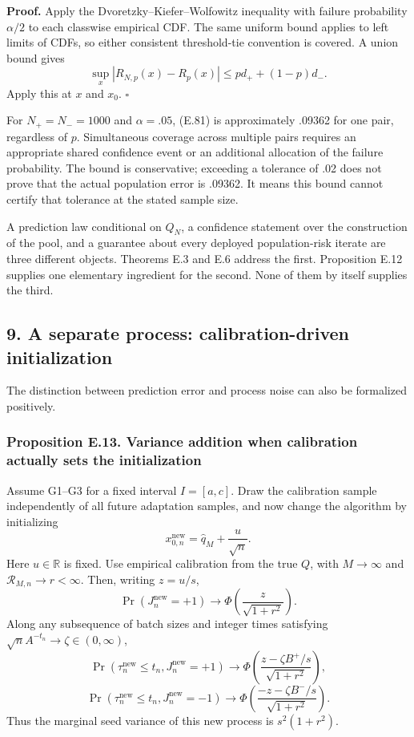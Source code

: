 \textbf{Proof.} Apply the Dvoretzky--Kiefer--Wolfowitz inequality with
failure probability \(\alpha/2\) to each classwise empirical CDF. The
same uniform bound applies to left limits of CDFs, so either consistent
threshold-tie convention is covered. A union bound gives \[
\sup_x|R_{N,p}(x)-R_p(x)|
\le p d_++(1-p)d_-.
\] Apply this at \(x\) and \(x_0\). \(\square\)

For \(N_+=N_-=1000\) and \(\alpha=.05\), (E.81) is approximately .09362
for one pair, regardless of \(p\). Simultaneous coverage across multiple
pairs requires an appropriate shared confidence event or an additional
allocation of the failure probability. The bound is conservative;
exceeding a tolerance of .02 does not prove that the actual population
error is .09362. It means this bound cannot certify that tolerance at
the stated sample size.

A prediction law conditional on \(Q_N\), a confidence statement over the
construction of the pool, and a guarantee about every deployed
population-risk iterate are three different objects. Theorems E.3 and
E.6 address the first. Proposition E.12 supplies one elementary
ingredient for the second. None of them by itself supplies the third.

\subsection{9. A separate process: calibration-driven
initialization}\label{risk_boundaries-a-separate-process-calibration-driven-initialization}

The distinction between prediction error and process noise can also be
formalized positively.

\subsubsection{Proposition E.13. Variance addition when calibration
actually sets the
initialization}\label{risk_boundaries-proposition-e.13.-variance-addition-when-calibration-actually-sets-the-initialization}

Assume G1--G3 for a fixed interval \(I=[a,c]\). Draw the calibration
sample independently of all future adaptation samples, and now change
the algorithm by initializing \[
x_{0,n}^{\mathrm{new}}=\widehat q_M+\frac u{\sqrt n}.
\tag{E.82}
\] Here \(u\in\mathbb R\) is fixed. Use empirical calibration from the
true \(Q\), with \(M\to\infty\) and \(\mathcal R_{M,n}\to r<\infty\).
Then, writing \(z=u/s\), \[
\Pr(J_n^{\mathrm{new}}=+1)
\longrightarrow\Phi\!\left(\frac z{\sqrt{1+r^2}}\right).
\tag{E.83}
\] Along any subsequence of batch sizes and integer times satisfying
\(\sqrt nA^{-t_n}\to\zeta\in(0,\infty)\), \[
\Pr(\tau_n^{\mathrm{new}}\le t_n,J_n^{\mathrm{new}}=+1)
\longrightarrow
\Phi\!\left(\frac{z-\zeta B^+/s}{\sqrt{1+r^2}}\right),
\] \[
\Pr(\tau_n^{\mathrm{new}}\le t_n,J_n^{\mathrm{new}}=-1)
\longrightarrow
\Phi\!\left(\frac{-z-\zeta B^-/s}{\sqrt{1+r^2}}\right).
\tag{E.84}
\] Thus the marginal seed variance of this new process is
\(s^2(1+r^2)\).

